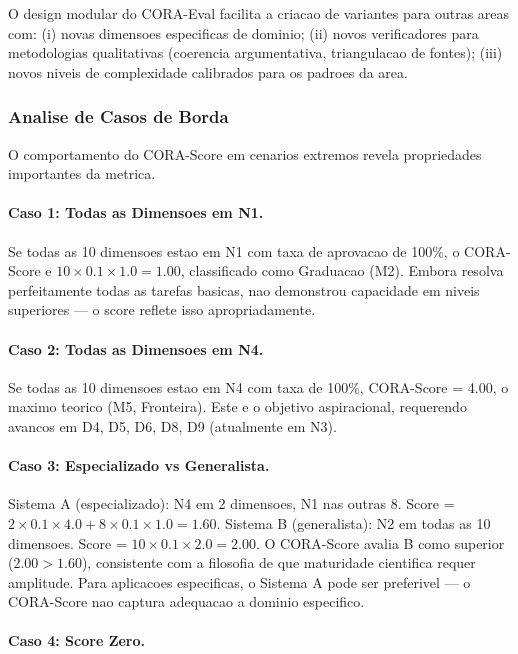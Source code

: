 O design modular do CORA-Eval facilita a criacao de variantes para outras
areas com: (i) novas dimensoes especificas de dominio; (ii) novos
verificadores para metodologias qualitativas (coerencia argumentativa,
triangulacao de fontes); (iii) novos niveis de complexidade calibrados
para os padroes da area.

\subsubsection{Analise de Casos de Borda}

O comportamento do CORA-Score em cenarios extremos revela propriedades
importantes da metrica.

\paragraph{Caso 1: Todas as Dimensoes em N1.}

Se todas as 10 dimensoes estao em N1 com taxa de aprovacao de 100\%, o
CORA-Score e $10 \times 0.1 \times 1.0 = 1.00$, classificado como
Graduacao (M2). Embora resolva perfeitamente todas as tarefas basicas,
nao demonstrou capacidade em niveis superiores --- o score reflete isso
apropriadamente.

\paragraph{Caso 2: Todas as Dimensoes em N4.}

Se todas as 10 dimensoes estao em N4 com taxa de 100\%, CORA-Score = 4.00,
o maximo teorico (M5, Fronteira). Este e o objetivo aspiracional,
requerendo avancos em D4, D5, D6, D8, D9 (atualmente em N3).

\paragraph{Caso 3: Especializado vs Generalista.}

Sistema A (especializado): N4 em 2 dimensoes, N1 nas outras 8. Score =
$2 \times 0.1 \times 4.0 + 8 \times 0.1 \times 1.0 = 1.60$. Sistema B
(generalista): N2 em todas as 10 dimensoes. Score = $10 \times 0.1 \times
2.0 = 2.00$. O CORA-Score avalia B como superior ($2.00 > 1.60$),
consistente com a filosofia de que maturidade cientifica requer amplitude.
Para aplicacoes especificas, o Sistema A pode ser preferivel --- o
CORA-Score nao captura adequacao a dominio especifico.

\paragraph{Caso 4: Score Zero.}

